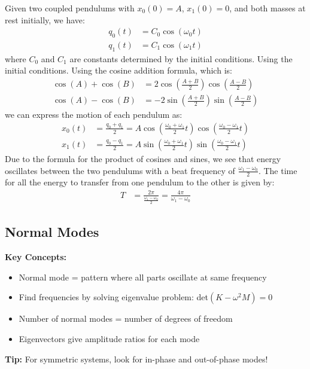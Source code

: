 \documentclass[11pt]{report}
\begin{document}
\begin{example}
    Given two coupled pendulums with $x_0(0) = A$, $x_1(0) = 0$, and both masses at rest initially, we have:
    \begin{align*}
        q_0(t) &= C_0 \cos(\omega_0 t) \\
        q_1(t) &= C_1 \cos(\omega_1 t)
    \end{align*}
    where \( C_0 \) and \( C_1 \) are constants determined by the initial conditions. Using the initial conditions. Using the cosine addition formula, which is:
    \begin{align*}
        \cos(A) + \cos(B) &= 2\cos\left(\frac{A+B}{2}\right)\cos\left(\frac{A-B}{2}\right) \\
        \cos(A) - \cos(B) &= -2\sin\left(\frac{A+B}{2}\right)\sin\left(\frac{A-B}{2}\right)
    \end{align*}
    we can express the motion of each pendulum as:
    \begin{align*}
        x_0(t) &= \frac{q_0 + q_1}{2} = A \cos\left(\frac{\omega_0 + \omega_1}{2} t\right) \cos\left(\frac{\omega_0 - \omega_1}{2} t\right) \\
        x_1(t) &= \frac{q_0 - q_1}{2} = A \sin\left(\frac{\omega_0 + \omega_1}{2} t\right) \sin\left(\frac{\omega_0 - \omega_1}{2} t\right)
    \end{align*}
    Due to the formula for the product of cosines and sines, we see that energy oscillates between the two pendulums with a beat frequency of \( \frac{\omega_1 - \omega_0}{2} \). The time for all the energy to transfer from one pendulum to the other is given by:
    \begin{align*}
        T &= \frac{2\pi}{\frac{\omega_1 - \omega_0}{2}} = \frac{4\pi}{\omega_1 - \omega_0}
    \end{align*}

\end{example}
\subsection{Normal Modes}

\begin{keybox}
\textbf{Key Concepts:}
\begin{itemize}
    \item Normal mode = pattern where all parts oscillate at same frequency
    \item Find frequencies by solving eigenvalue problem: det$(K - \omega^2 M) = 0$
    \item Number of normal modes = number of degrees of freedom
    \item Eigenvectors give amplitude ratios for each mode
\end{itemize}
\textbf{Tip:} For symmetric systems, look for in-phase and out-of-phase modes!
\end{keybox}
\end{document}

